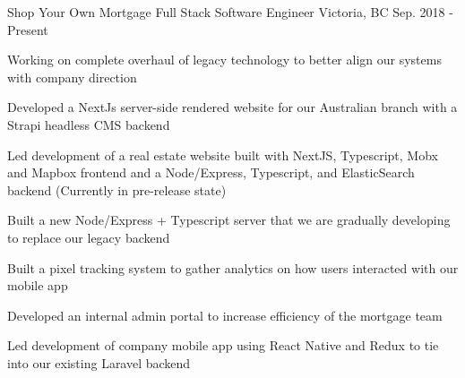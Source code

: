 \begin{cventries}
\cventry
{Shop Your Own Mortgage} %
{Full Stack Software Engineer} %
{Victoria, BC} %
{Sep. 2018 - Present} %
{ %
\begin{cvitems}
\item {Working on complete overhaul of legacy technology to better align our systems with company direction}
\item {Developed a NextJs server-side rendered website for our Australian branch with a Strapi headless CMS backend}
\item {Led development of a real estate website built with NextJS, Typescript, Mobx and Mapbox frontend and a Node/Express, Typescript, and ElasticSearch backend (Currently in pre-release state)}
\item {Built a new Node/Express + Typescript server that we are gradually developing to replace our legacy backend}
\item {Built a pixel tracking system to gather analytics on how users interacted with our mobile app}
\item {Developed an internal admin portal to increase efficiency of the mortgage team}
\item {Led development of company mobile app using React Native and Redux to tie into our existing Laravel backend}
\end{cvitems}
}

\end{cventries}